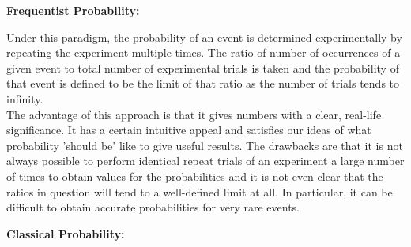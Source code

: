 \documentclass[12pt,a4paper]{article}
\begin{document}
\vspace{12pt}
\noindent\textbf{Frequentist Probability:}\par
\vspace{12pt}

Under this paradigm, the probability of an event is determined experimentally by repeating the experiment multiple times. The ratio of number of occurrences of a given event to total number of experimental trials is taken and the probability of that event is defined to be the limit of that ratio as the number of trials tends to infinity.\\
\indent The advantage of this approach is that it gives numbers with a clear, real-life significance. It has a certain intuitive appeal and satisfies our ideas of what probability 'should be' like to give useful results. The drawbacks are that it is not always possible to perform identical repeat trials of an experiment a large number of times to obtain values for the probabilities and it is not even clear that the ratios in question will tend to a well-defined limit at all. In particular, it can be difficult to obtain accurate probabilities for very rare events.\par
\vspace{12pt}

\noindent\textbf{Classical Probability:}\par
\vspace{12pt}
\end{document}
